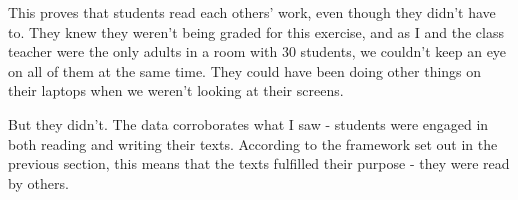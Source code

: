 This proves that students read each others' work, even though they didn't have to. They knew they weren't being graded for this exercise, and as I and the class teacher were the only adults in a room with 30 students, we couldn't keep an eye on all of them at the same time. They could have been doing other things on their laptops when we weren't looking at their screens.

But they didn't. The data corroborates what I saw - students were engaged in both reading and writing their texts. According to the framework set out in the previous section, this means that the texts fulfilled their purpose - they were read by others. 

